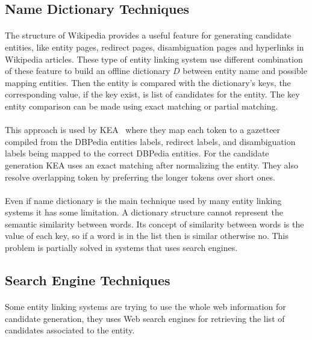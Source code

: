 \subsection{Name Dictionary Techniques}
\paragraph{}
The structure of Wikipedia provides a useful feature for generating candidate entities, like entity pages, redirect pages, disambiguation pages and hyperlinks in Wikipedia articles. These type of entity linking system use different combination of these feature to build an offline dictionary $D$ between entity name and possible mapping entities. Then the entity is compared with the dictionary's keys, the corresponding value, if the key exist, is list of candidates for the entity. The key entity comparison can be made using exact matching or partial matching. 

\paragraph{}
This approach is used by KEA~\cite{waitelonisnamed} where they map each token to a gazetteer compiled from the DBPedia entities labels, redirect labels, and disambiguation labels being mapped to the correct DBPedia entities. For the candidate generation KEA uses an exact matching  after normalizing the entity. They also resolve overlapping token by preferring the longer tokens over short ones.

\paragraph{}
Even if name dictionary is the main technique used by many entity linking systems it has some limitation. A dictionary structure cannot represent the semantic similarity between words. Its concept of similarity between words is the value of each key, so if a word is in the list then is similar otherwise no. This problem is partially solved in systems that uses search engines.

\subsection{Search Engine Techniques}
\paragraph{}
Some entity linking systems are trying to use the whole web information for candidate generation, they uses Web search engines for retrieving the list of candidates associated to the entity.


